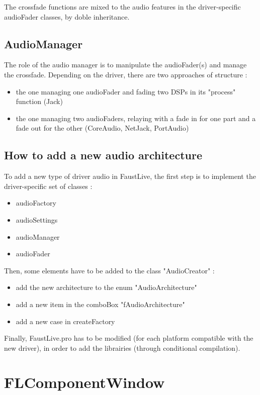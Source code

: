 \documentclass[a4paper]{article}
\begin{document}
{The crossfade functions are mixed to the audio features in the driver-specific audioFader classes, by doble inheritance.

\subsection{AudioManager}

The role of the audio manager is to manipulate the audioFader(s) and manage the crossfade. Depending on the driver, there are two approaches of structure :
\begin{itemize}
\item the one managing one audioFader and fading two DSPs in its "process" function (Jack)
\item the one managing two audioFaders, relaying with a fade in for one part and a fade out for the other (CoreAudio, NetJack, PortAudio)
\end{itemize}

\subsection{How to add a new audio architecture}

To add a new type of driver audio in FaustLive, the first step is to implement the driver-specific set of classes :
\begin{itemize}
\item audioFactory
\item audioSettings
\item audioManager
\item audioFader
\end{itemize}

Then, some elements have to be added to the class "AudioCreator" : 
\begin{itemize}
\item add the new architecture to the enum "AudioArchitecture"
\item add a new item in the comboBox "fAudioArchitecture"
\item add a new case in createFactory
\end{itemize}

Finally, FaustLive.pro has to be modified (for each platform compatible with the new driver), in order to add the librairies (through conditional compilation).

\section{FLComponentWindow}

}
\end{document}
